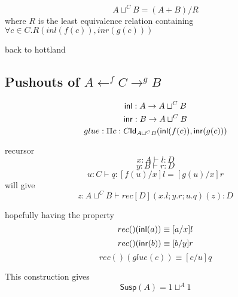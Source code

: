 \documentclass[11pt]{article}
\newcommand{\susp}[1]{\mathsf{Susp}(#1)}
\begin{document}
$$A \sqcup^C B = (A + B) / R$$
where $R$ is the least equivalence relation containing $\forall c \in C. R(inl(f(c)), inr(g(c)))$

back to hottland

\subsection{Pushouts of $A \leftarrow^f C \rightarrow^g B$}
$${\mathsf{inl}} : A \rightarrow A \sqcup^C B$$
$${\mathsf{inr}} : B \rightarrow A \sqcup^C B$$
$$glue : \Pi c : C \mathsf{Id}_{A \sqcup^C B} ({\mathsf{inl}}(f(c)), {\mathsf{inr}}(g(c)))$$

recursor
$$x : A \vdash l : D$$
$$y : B \vdash r : D$$
$$u : C \vdash q : [f(u)/x]l = [g(u)/x]r$$
will give
$$z : A \sqcup^C B \vdash rec[D](x.l; y.r; u.q)(z) : D$$

hopefully having the property
$$rec( )({\mathsf{inl}}(a)) \equiv [a/x]l$$
$$rec( )({\mathsf{inr}}(b)) \equiv [b/y]r$$
$$rec( )(glue(c)) \equiv [c/u]q$$

This construction gives
$$\susp A = 1 \sqcup^A 1$$
\end{document}
